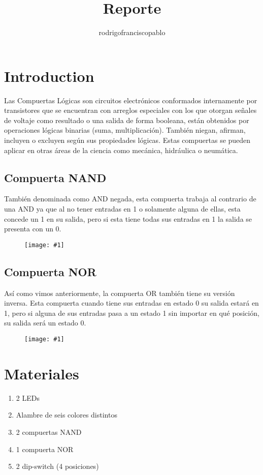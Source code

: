 \documentclass{mylib/reporte}
\title{Reporte}
\author{rodrigofranciscopablo }
\newcommand{\insertImage}[2]{
	\begin{figure}[H]
		\centering
		\texttt{[image: \#1]}
	\end{figure}
}
\begin{document}
\coverPage

\tableofcontents
\newpage

\section{Introduction}

Las Compuertas Lógicas son circuitos electrónicos conformados internamente por transistores que se encuentran con arreglos especiales con los que otorgan señales de voltaje como resultado o una salida de forma booleana, están obtenidos por operaciones lógicas binarias (suma, multiplicación). También niegan, afirman, incluyen o excluyen según sus propiedades lógicas. Estas compuertas se pueden aplicar en otras áreas de la ciencia como mecánica, hidráulica o neumática.\\

\subsection{Compuerta NAND}
También denominada como AND negada, esta compuerta trabaja al contrario de una AND ya que al no tener entradas en 1 o solamente alguna de ellas, esta concede un 1 en su salida, pero si esta tiene todas sus entradas en 1 la salida se presenta con un 0.

\insertImage{img/dise_proy2/semisum}{6}

\subsection{Compuerta NOR}

Así como vimos anteriormente, la compuerta OR también tiene su versión inversa. Esta compuerta cuando tiene sus entradas en estado 0 su salida estará en 1, pero si alguna de sus entradas pasa a un estado 1 sin importar en qué posición, su salida será un estado 0.


\insertImage{img/dise_proy2/fullsum}{6}

\section{Materiales}

\begin{enumerate}
	\item 2 LEDs
	\item Alambre de seis colores distintos
	\item 2 compuertas NAND
	\item 1 compuerta NOR
	\item 2 dip-switch (4 posiciones)
\end{enumerate}	
\end{document}
